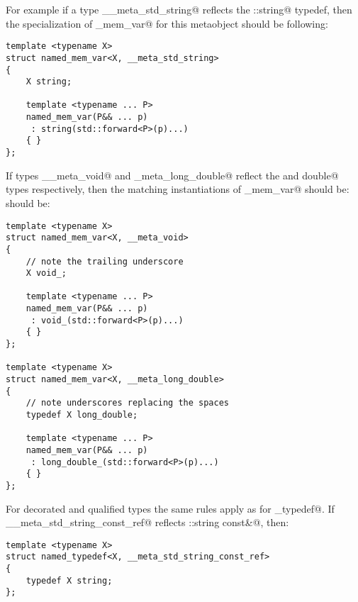 For example if a type \verb@__meta_std_string@
reflects the \verb@std::string@ typedef, then the specialization of \verb@named_mem_var@
for this metaobject should be following:

\begin{verbatim}
template <typename X>
struct named_mem_var<X, __meta_std_string>
{
	X string;

	template <typename ... P>
	named_mem_var(P&& ... p)
	 : string(std::forward<P>(p)...)
	{ }
};
\end{verbatim}

If types \verb@__meta_void@ and \verb@_meta_long_double@ reflect the \verb@void@ and \verb@long double@
types respectively, then the matching instantiations of \verb@named_mem_var@ should be:
should be:

\begin{verbatim}
template <typename X>
struct named_mem_var<X, __meta_void>
{
	// note the trailing underscore
	X void_;

	template <typename ... P>
	named_mem_var(P&& ... p)
	 : void_(std::forward<P>(p)...)
	{ }
};

template <typename X>
struct named_mem_var<X, __meta_long_double>
{
	// note underscores replacing the spaces
	typedef X long_double;

	template <typename ... P>
	named_mem_var(P&& ... p)
	 : long_double_(std::forward<P>(p)...)
	{ }
};
\end{verbatim}

For decorated and qualified types the same rules apply as for \verb@named_typedef@.
If \verb@__meta_std_string_const_ref@ reflects \verb@std::string const&@, then:

\begin{verbatim}
template <typename X>
struct named_typedef<X, __meta_std_string_const_ref>
{
	typedef X string;
};
\end{verbatim}

